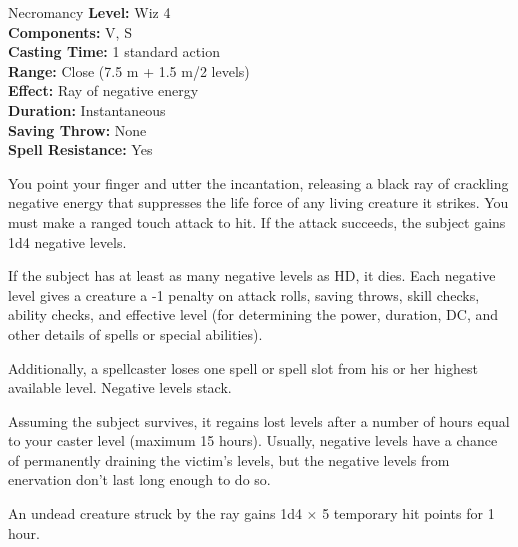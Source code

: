 {Necromancy}
{
	\textbf{Level:}
	Wiz 4\\
	\textbf{Components:}
	V, S\\
	\textbf{Casting Time:}
	1 standard action\\
	\textbf{Range:}
	Close (7.5 m + 1.5 m/2 levels)\\
	\textbf{Effect:}
	Ray of negative energy\\
	\textbf{Duration:}
	Instantaneous\\
	\textbf{Saving Throw:}
	None\\
	\textbf{Spell Resistance:}
	Yes\\
}
{
	You point your finger and utter the incantation, releasing a black ray of crackling negative energy that suppresses the life force of any living creature it strikes. You must make a ranged touch attack to hit. If the attack succeeds, the subject gains 1d4 negative levels.

	If the subject has at least as many negative levels as HD, it dies. Each negative level gives a creature a -1 penalty on attack rolls, saving throws, skill checks, ability checks, and effective level (for determining the power, duration, DC, and other details of spells or special abilities).

	Additionally, a spellcaster loses one spell or spell slot from his or her highest available level. Negative levels stack.

	Assuming the subject survives, it regains lost levels after a number of hours equal to your caster level (maximum 15 hours). Usually, negative levels have a chance of permanently draining the victim's levels, but the negative levels from enervation don't last long enough to do so.

	An undead creature struck by the ray gains 1d4 $\times$ 5 temporary hit points for 1 hour.

}
